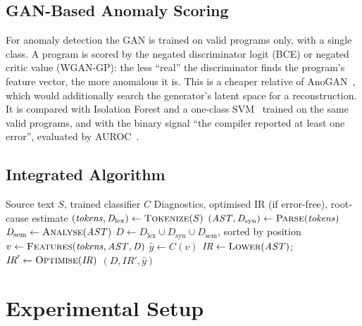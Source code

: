 \documentclass[conference]{IEEEtran}
\begin{document}
\subsection{GAN-Based Anomaly Scoring}

For anomaly detection the GAN is trained on valid programs only, with a single class. A program is scored by the
negated discriminator logit (BCE) or negated critic value (WGAN-GP): the less ``real'' the discriminator finds the
program's feature vector, the more anomalous it is. This is a cheaper relative of AnoGAN~\cite{schlegl2017}, which would
additionally search the generator's latent space for a reconstruction. It is compared with Isolation Forest
\cite{liu2008} and a one-class SVM~\cite{scholkopf2001} trained on the same valid programs, and with the binary signal
``the compiler reported at least one error'', evaluated by AUROC~\cite{fawcett2006}.

\subsection{Integrated Algorithm}

\begin{algorithm}[t]
\caption{End-to-end processing of a MedScript program}
\label{alg:pipeline}
\begin{algorithmic}[1]
\Require Source text $S$, trained classifier $C$
\Ensure Diagnostics, optimised IR (if error-free), root-cause estimate
\State $(\mathit{tokens},\mathit{D}_{\text{lex}})\gets\textsc{Tokenize}(S)$
\State $(\mathit{AST},\mathit{D}_{\text{syn}})\gets\textsc{Parse}(\mathit{tokens})$
    \State $\mathit{D}_{\text{sem}}\gets\textsc{Analyse}(\mathit{AST})$ 
\EndIf
\State $\mathit{D}\gets\mathit{D}_{\text{lex}}\cup\mathit{D}_{\text{syn}}\cup\mathit{D}_{\text{sem}}$, sorted by position
\State $v\gets\textsc{Features}(\mathit{tokens},\mathit{AST},\mathit{D})$
\State $\hat{y}\gets C(v)$
    \State $\mathit{IR}\gets\textsc{Lower}(\mathit{AST})$; $\mathit{IR}'\gets\textsc{Optimise}(\mathit{IR})$
\EndIf
\State \Return $(\mathit{D},\mathit{IR}',\hat{y})$
\end{algorithmic}
\end{algorithm}


\section{Experimental Setup}\label{sec:setup}
\end{document}
